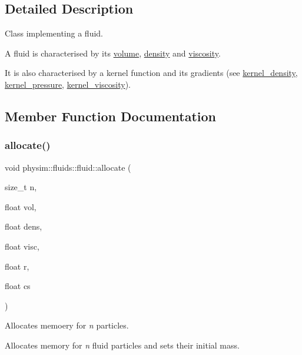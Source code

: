 \subsection{Detailed Description}
Class implementing a fluid. 

A fluid is characterised by its \hyperlink{classphysim_1_1fluids_1_1fluid_afaf22d3c8f6a042e838daff1132c5a7a}{volume}, \hyperlink{classphysim_1_1fluids_1_1fluid_a27be9c413c5773096f158d5d9c252731}{density} and \hyperlink{classphysim_1_1fluids_1_1fluid_ad5c3e98b6aac62058af8defcb20a2678}{viscosity}.

It is also characterised by a kernel function and its gradients (see \hyperlink{classphysim_1_1fluids_1_1fluid_a8774f815e80bb81ddc14890fee13bffc}{kernel\+\_\+density}, \hyperlink{classphysim_1_1fluids_1_1fluid_ae3ccfb94b27e6a1464210d36744f16a4}{kernel\+\_\+pressure}, \hyperlink{classphysim_1_1fluids_1_1fluid_a5ba8b8fc47ed8c45c279aebf5d62899d}{kernel\+\_\+viscosity}). 

\subsection{Member Function Documentation}
\mbox{\label{classphysim_1_1fluids_1_1fluid_a1572bdeaca8942347aa79ee35a112ce6}} 
\subsubsection{\texorpdfstring{allocate()}{allocate()}}
{\footnotesize\ttfamily void physim\+::fluids\+::fluid\+::allocate (\begin{DoxyParamCaption}\item[{size\+\_\+t}]{n,  }\item[{float}]{vol,  }\item[{float}]{dens,  }\item[{float}]{visc,  }\item[{float}]{r,  }\item[{float}]{cs }\end{DoxyParamCaption})}



Allocates memoery for {\itshape n} particles. 

Allocates memory for {\itshape n} fluid particles and sets their initial mass.

